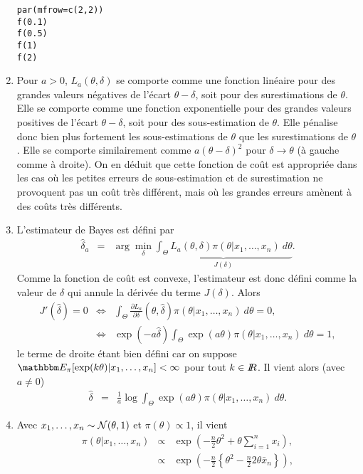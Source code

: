\begin{enumerate}
\begin{verbatim}
par(mfrow=c(2,2))
f(0.1)
f(0.5)
f(1)
f(2)
\end{verbatim} 
\item Pour $a>0$, $L_a(\theta,\delta)$ se comporte comme une fonction linéaire pour des grandes valeurs négatives de l'écart $\theta-\delta$, soit pour des surestimations de $\theta$. Elle se comporte comme une fonction exponentielle pour des grandes valeurs positives de l'écart $\theta-\delta$, soit pour des sous-estimation de $\theta$. Elle pénalise donc bien plus fortement les sous-estimations de $\theta$ que les surestimations de $\theta$. Elle se comporte similairement comme $a(\theta-\delta)^2$ pour $\delta\to\theta$ (à gauche comme à droite). On en déduit que cette fonction de coût est appropriée dans les cas où les petites erreurs de sous-estimation et de surestimation ne provoquent pas un coût très différent, mais où les grandes erreurs amènent à des coûts très différents. 
\item L'estimateur de Bayes est défini par
\begin{eqnarray*}
\hat{\delta}_a & = & \arg\min\limits_{\delta} \underbrace{\int_{\Theta} L_a(\theta,\delta) \pi(\theta|x_1,\ldots,x_n) \ d\theta}_{J(\delta)}.
\end{eqnarray*}
Comme la fonction de coût est convexe, l'estimateur est donc défini comme la valeur de $\delta$ qui annule la dérivée du terme $J(\delta)$. Alors
\begin{eqnarray*}
J'(\hat{\delta}) = 0 & \Leftrightarrow & \int_{\Theta} \frac{\partial L_a}{\partial \delta}(\theta,\hat{\delta}) \pi(\theta|x_1,\ldots,x_n) \ d\theta = 0, \\
& \Leftrightarrow & \exp(-a\hat{\delta}) \int_{\Theta} \exp(a\theta) \pi(\theta|x_1,\ldots,x_n) \ d\theta = 1,
\end{eqnarray*}
le terme de droite étant bien défini car on suppose $\E_{\pi}[\exp(k\theta)|x_1,\ldots,x_n]<\infty$ pour tout $k\in I\!\!R$. Il vient alors (avec $a\neq 0$) 
\begin{eqnarray}
\hat{\delta} & = & \frac{1}{a}\log  \int_{\Theta} \exp(a\theta) \pi(\theta|x_1,\ldots,x_n) \ d\theta. \label{estimateur}
\end{eqnarray}
\item Avec $x_1,\ldots,x_n\sim{\cal{N}}(\theta,1)$ et $\pi(\theta)\propto 1$, il vient
\begin{eqnarray*}
\pi(\theta|x_1,\ldots,x_n) & \propto & \exp\left(- \frac{n}{2}\theta^2 + \theta \sum\limits_{i=1}^n x_i \right), \\
 & \propto & \exp\left(- \frac{n}{2}\left\{\theta^2 - \frac{n}{2} 2\theta \bar{x}_n\right\} \right), \\

\end{eqnarray*}
\end{enumerate}
